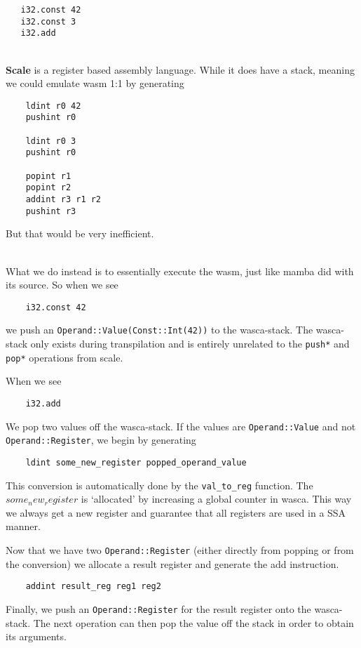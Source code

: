 \begin{lstlisting}
   i32.const 42
   i32.const 3
   i32.add
\end{lstlisting}

~ \\

\noindent
{\bf{Scale}} is a register based assembly language.
While it does have a stack, meaning we could emulate wasm 1:1 by generating

\begin{lstlisting}
    ldint r0 42
    pushint r0

    ldint r0 3
    pushint r0

    popint r1
    popint r2
    addint r3 r1 r2
    pushint r3
\end{lstlisting}
But that would be very inefficient.

~ \\

What we do instead is to essentially execute the wasm, just like mamba did with its source. So when we see
\begin{lstlisting}
    i32.const 42
\end{lstlisting}
we push an \verb|Operand::Value(Const::Int(42))| to the wasca-stack.
The wasca-stack only exists during transpilation and is entirely unrelated to the \verb|push*| and \verb|pop*|
operations from scale.

When we see
\begin{lstlisting}
    i32.add
\end{lstlisting}
We pop two values off the wasca-stack. If the values are \verb|Operand::Value| and not
\verb|Operand::Register|, we begin by generating

\begin{lstlisting}
    ldint some_new_register popped_operand_value
\end{lstlisting}
This conversion is automatically done by the \verb|val_to_reg| function.
The $some_new_register$ is `allocated' by increasing a global counter in wasca.
This way we always get a new register and guarantee that all registers are used in a SSA manner.

Now that we have two \verb|Operand::Register| (either directly from popping or from the conversion)
we allocate a result register and generate the add instruction.
\begin{lstlisting}
    addint result_reg reg1 reg2
\end{lstlisting}
Finally, we push an \verb|Operand::Register| for the result register onto the wasca-stack.
The next operation can then pop the value off the stack in order to obtain its arguments.



